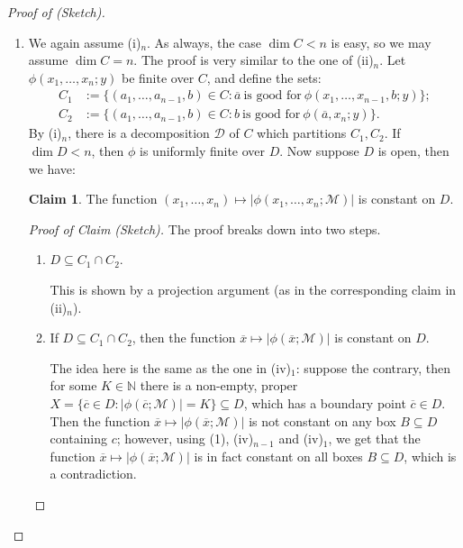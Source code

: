 \documentclass[a4paper]{report}
\makeatletter
\newcommand{\Nat}{\mathbb{N}}
\newcommand{\D}{\mathcal{D}}
\newcommand{\M}{\mathcal{M}}
\newcommand{\x}{\overline{x}}
\renewcommand{\a}{\overline{a}}
\renewcommand{\c}{\overline{c}}
\theoremstyle{definition}
\theoremstyle{remstyle}
\newtheorem*{claim*}{Claim}
\providecommand*{\dashv}{%
	\mathrel{%
		\mathpalette\@dashv\vdash
	}%
}
\newcommand*{\@dashv}[2]{%
	\reflectbox{$\m@th#1#2$}%
}
\newenvironment{subproof}[1][\proofname]{%
	\renewcommand{\qedsymbol}{$\dashv$}%
	\begin{proof}[#1]%
	}{%
	\end{proof}%
}
\makeatother
\begin{document}
\begin{proof}[Proof of  (Sketch)]
\begin{itemize}[leftmargin=*,itemsep=12pt]
\begin{enumerate}[itemsep=12pt,label=(\roman*)$_n$]
			      \item We again assume (i)$_n$. As always, the case $\dim C<n$ is easy, so we may assume $\dim C=n$. The proof is very similar to the one of (ii)$_n$. Let $\phi(x_1,\ldots,x_n;y)$ be finite over $C$, and define the sets:
			            \begin{equation*}
				            \begin{aligned}
					            C_1 & := \{(a_1,\ldots,a_{n-1},b)\in C:\a\ \text{is good for}\ \phi(x_1,\ldots,x_{n-1},b;y)\}; \\
					            C_2 & := \{(a_1,\ldots,a_{n-1},b)\in C:b\ \text{is good for}\ \phi(\a,x_n;y)\}.
				            \end{aligned}
			            \end{equation*}
			            By (i)$_n$, there is a decomposition $\D$ of $C$ which partitions $C_1,C_2$. If $\dim D<n$, then $\phi$ is uniformly finite over $D$. Now suppose $D$ is open, then we have:

			            \begin{claim*}
				            The function $(x_1,\ldots,x_n)\mapsto|\phi(x_1,\ldots,x_n;\M)|$ is constant on $D$.
			            \end{claim*}

			            \begin{subproof}[Proof of Claim (Sketch)]
				            The proof breaks down into two steps.
				            \begin{enumerate}[leftmargin=*,label=(\arabic*)]
					            \item $D\subseteq C_1\cap C_2$.

					                  This is shown by a projection argument (as in the corresponding claim in (ii)$_n$).

					            \item If $D\subseteq C_1\cap C_2$, then the function $\x\mapsto|\phi(\x;\M)|$ is constant on $D$.

					                  The idea here is the same as the one in (iv)$_1$: suppose the contrary, then for some $K\in\Nat$ there is a non-empty, proper $X=\{\c\in D:|\phi(\c;\M)|=K\}\subseteq D$, which has a boundary point $\c\in D$. Then the function $\x\mapsto|\phi(\x;\M)|$ is not constant on any box $B\subseteq D$ containing $c$; however, using (1), (iv)$_{n-1}$ and (iv)$_1$, we get that the function $\x\mapsto|\phi(\x;\M)|$ is in fact constant on all boxes $B\subseteq D$, which is a contradiction.
				            \end{enumerate}
			            \end{subproof}


\end{enumerate}
\end{itemize}
\end{proof}
\end{document}
